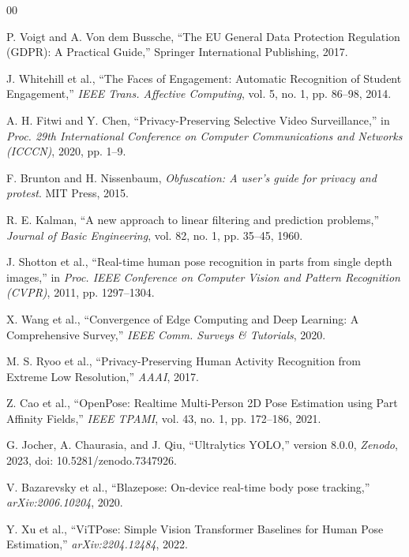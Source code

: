\documentclass[conference]{IEEEtran}
\begin{document}
\begin{thebibliography}{00}

 P. Voigt and A. Von dem Bussche, ``The EU General Data Protection Regulation (GDPR): A Practical Guide,'' Springer International Publishing, 2017.

 J. Whitehill et al., ``The Faces of Engagement: Automatic Recognition of Student Engagement,'' \textit{IEEE Trans. Affective Computing}, vol. 5, no. 1, pp. 86--98, 2014.

 A. H. Fitwi and Y. Chen, ``Privacy-Preserving Selective Video Surveillance,'' in \textit{Proc. 29th International Conference on Computer Communications and Networks (ICCCN)}, 2020, pp. 1--9.

 F. Brunton and H. Nissenbaum, \textit{Obfuscation: A user's guide for privacy and protest}. MIT Press, 2015.

 R. E. Kalman, ``A new approach to linear filtering and prediction problems,'' \textit{Journal of Basic Engineering}, vol. 82, no. 1, pp. 35--45, 1960.

 J. Shotton et al., ``Real-time human pose recognition in parts from single depth images,'' in \textit{Proc. IEEE Conference on Computer Vision and Pattern Recognition (CVPR)}, 2011, pp. 1297--1304.

 X. Wang et al., ``Convergence of Edge Computing and Deep Learning: A Comprehensive Survey,'' \textit{IEEE Comm. Surveys \& Tutorials}, 2020.

 M. S. Ryoo et al., ``Privacy-Preserving Human Activity Recognition from Extreme Low Resolution,'' \textit{AAAI}, 2017.

 Z. Cao et al., ``OpenPose: Realtime Multi-Person 2D Pose Estimation using Part Affinity Fields,'' \textit{IEEE TPAMI}, vol. 43, no. 1, pp. 172--186, 2021.

 G. Jocher, A. Chaurasia, and J. Qiu, ``Ultralytics YOLO,'' version 8.0.0, \textit{Zenodo}, 2023, doi: 10.5281/zenodo.7347926.

 V. Bazarevsky et al., ``Blazepose: On-device real-time body pose tracking,'' \textit{arXiv:2006.10204}, 2020.

 Y. Xu et al., ``ViTPose: Simple Vision Transformer Baselines for Human Pose Estimation,'' \textit{arXiv:2204.12484}, 2022.


\end{thebibliography}
\end{document}
